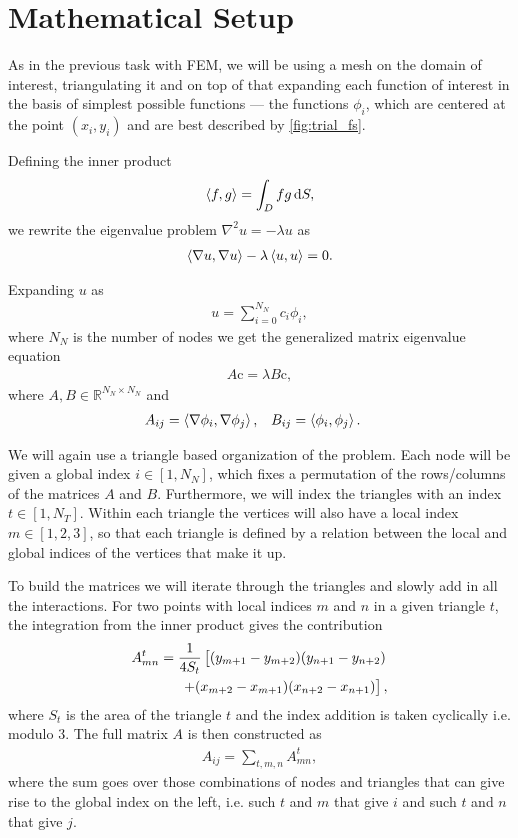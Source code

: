 \documentclass[10pt,a4paper,twocolumn]{article}
\renewcommand{\vec}[1]{\bm{\mathrm{#1}}}
\begin{document}
\section{Mathematical Setup}

As in the previous task with FEM, we will be using a mesh on the domain of interest, triangulating it and on top of that expanding each function of interest in the basis of simplest possible functions --- the functions $\phi_i$, which are centered at the point $(x_i, y_i)$ and are best described by \cref{fig:trial_fs}.


Defining the inner product
%
\begin{align}
    \braket{f, g} = \int_{D} f g \dif S,
\end{align}
%
we rewrite the eigenvalue problem $\nabla^2 u = - \lambda u$ as
%
\begin{align}
    \braket{\nabla u, \nabla u} - \lambda \braket{u, u}=0.
\end{align}

Expanding $u$ as
%
\begin{align}
    u = \sum_{i=0}^{N_N} c_i \phi_i,
\end{align}
%
where $N_N$ is the number of nodes we get the generalized matrix eigenvalue equation
%
\begin{align}
    A \vec{c} = \lambda B \vec{c},
\end{align}
%
where $A, B \in \mathbb{R}^{N_N \times N_N}$ and 
%
\begin{align}
    &A_{ij} = \braket{\nabla \phi_i, \nabla \phi_j},& &B_{ij} = \braket{\phi_i, \phi_j}.&
\end{align}

We will again use a triangle based organization of the problem. Each node will be given a global index $i \in [1, N_N]$, which fixes a permutation of the rows/columns of the matrices $A$ and $B$. Furthermore, we will index the triangles with an index $t \in [1, N_T]$. Within each triangle the vertices will also have a local index $m \in [1, 2, 3]$, so that each triangle is defined by a relation between the local and global indices of the vertices that make it up.

To build the matrices we will iterate through the triangles and slowly add in all the interactions. For two points with local indices $m$ and $n$ in a given triangle $t$, the integration from the inner product gives the contribution
%
\begin{align}
    A^{t}_{mn} = \frac{1}{4 S_{t}}\left[ (y_{m+1} - y_{m+2})(y_{n+1} - y_{n+2}) \right. \notag\\ \left. + (x_{m+2} - x_{m+1})(x_{n+2} - x_{n+1}) \right],
\end{align}
%
where $S_t$ is the area of the triangle $t$ and the index addition is taken cyclically i.e. modulo $3$. The full matrix $A$ is then constructed as
%
\begin{align}
    A_{i j} = \sum_{t, m, n} A^{t}_{mn},
\end{align}
%
where the sum goes over those combinations of nodes and triangles that can give rise to the global index on the left, i.e. such $t$ and $m$ that give $i$ and such $t$ and $n$ that give $j$.
\end{document}
